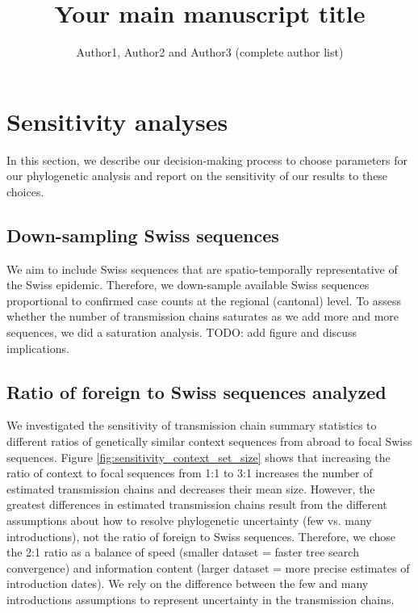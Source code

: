 \documentclass[9pt,twoside,lineno]{pnas-new}
\title{Your main manuscript title}
\author{Author1, Author2 and Author3 (complete author list)}
\begin{document}

\maketitle 

\SItext


\section{Sensitivity analyses}

In this section, we describe our decision-making process to choose parameters for our phylogenetic analysis and report on the sensitivity of our results to these choices. 

\subsection{Down-sampling Swiss sequences}
We aim to include Swiss sequences that are spatio-temporally representative of the Swiss epidemic. Therefore, we down-sample available Swiss sequences proportional to confirmed case counts at the regional (cantonal) level. To assess whether the number of transmission chains saturates as we add more and more sequences, we did a saturation analysis. TODO: add figure and discuss implications.

\subsection{Ratio of foreign to Swiss sequences analyzed}
We investigated the sensitivity of transmission chain summary statistics to different ratios of genetically similar context sequences from abroad to focal Swiss sequences. Figure \ref{fig:sensitivity_context_set_size} shows that increasing the ratio of context to focal sequences from 1:1 to 3:1 increases the number of estimated transmission chains and decreases their mean size. However, the greatest differences in estimated transmission chains result from the different assumptions about how to resolve phylogenetic uncertainty (few vs. many introductions), not the ratio of foreign to Swiss sequences. Therefore, we chose the 2:1 ratio as a balance of speed (smaller dataset = faster tree search convergence) and information content (larger dataset = more precise estimates of introduction dates). We rely on the difference between the few and many introductions assumptions to represent uncertainty in the transmission chains.
\end{document}

